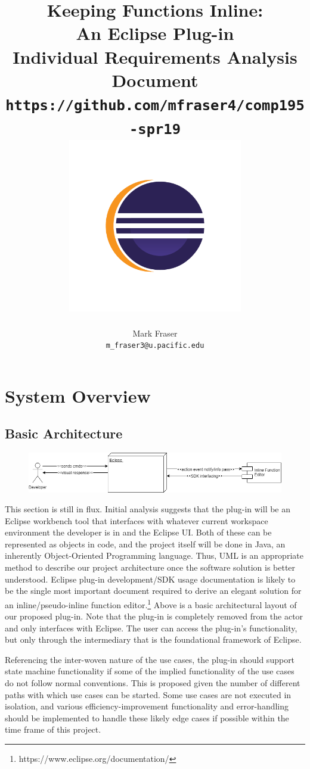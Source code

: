 \documentclass[]{report}
\title{Keeping Functions Inline:\\An Eclipse Plug-in\\ Individual Requirements Analysis Document\\ \vspace{1cm} \texttt{https://github.com/mfraser4/comp195-spr19} \\ \includegraphics[width=3in]{imgs/eclipse_logo.png}}
\author{Mark Fraser\\\texttt{m\_fraser3@u.pacific.edu}}
\begin{document}
\maketitle

\newpage
\tableofcontents
\newpage

\chapter{System Overview}

	\section{Basic Architecture}
	
		\begin{figure}[h!]
			\includegraphics[width=\linewidth]{imgs/basic_architecture.png}
		\end{figure}
	
		This section is still in flux.  Initial analysis suggests that the plug-in will be an Eclipse workbench tool that interfaces with whatever current workspace environment the developer is in and the Eclipse UI.  Both of these can be represented as objects in code, and the project itself will be done in Java, an inherently Object-Oriented Programming language.  Thus, UML is an appropriate method to describe our project architecture once the software solution is better understood.  Eclipse plug-in development/SDK usage documentation is likely to be the single most important document required to derive an elegant solution for an inline/pseudo-inline function editor.\footnote{https://www.eclipse.org/documentation/}  Above is a basic architectural layout of our proposed plug-in.  Note that the plug-in is completely removed from the actor and only interfaces with Eclipse.  The user can access the plug-in's functionality, but only through the intermediary that is the foundational framework of Eclipse.
		
		Referencing the inter-woven nature of the use cases, the plug-in should support state machine functionality if some of the implied functionality of the use cases do not follow normal conventions.  This is proposed given the number of different paths with which use cases can be started.  Some use cases are not executed in isolation, and various efficiency-improvement functionality and error-handling should be implemented to handle these likely edge cases if possible within the time frame of this project.
	
\end{document}
